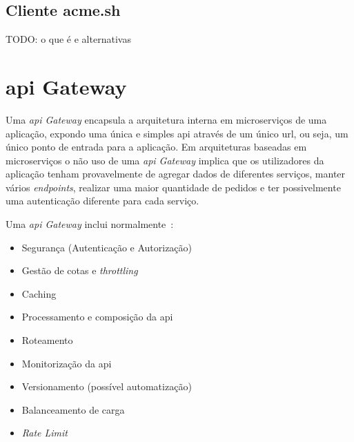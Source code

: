 \subsection{Cliente acme.sh}
TODO: o que é e alternativas

\section{\acrshort{api} Gateway}\label{sec:api_gateway}

Uma \textit{\acrshort{api} Gateway} encapsula a arquitetura interna em microserviços de uma aplicação, expondo uma única e simples \acrshort{api} através de um único \acrshort{url}, ou seja, um único ponto de entrada para a aplicação. Em arquiteturas baseadas em microserviços o não uso de uma \textit{\acrshort{api} Gateway} implica que os utilizadores da aplicação tenham provavelmente de agregar dados de diferentes serviços, manter vários \textit{endpoints}, realizar uma maior quantidade de pedidos e ter possivelmente uma autenticação diferente para cada serviço.

Uma \textit{\acrshort{api} Gateway} inclui normalmente~\cite{apiGatInfo,apiGatInfo2}:
\begin{itemize}
    \item Segurança (Autenticação e Autorização)
    \item Gestão de cotas e \textit{throttling}
    \item Caching
    \item Processamento e composição da \acrshort{api}
    \item Roteamento
    \item Monitorização da \acrshort{api}
    \item Versionamento (possível automatização)
    \item Balanceamento de carga
    \item \textit{Rate Limit}
\end{itemize}

